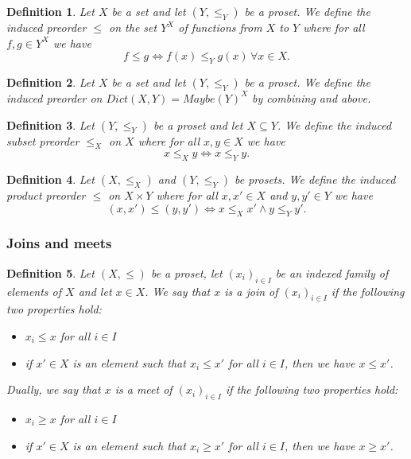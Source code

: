 \documentclass[runningheads]{llncs}
\newtheorem{defn}{Definition}
\begin{document}
\begin{defn}\label{defn:function-preorder}
	Let \(X\) be a set and let \((Y,\leq_Y)\) be a proset. We define the induced preorder \(\leq\) on the set \(Y^X\) of functions from \(X\) to \(Y\) where for all \(f,g \in Y^X\) we have \[f \leq g \Leftrightarrow f(x) \leq_Y g(x)\, \forall x \in X.\]
\end{defn}

\begin{defn}\label{defn:dictionary-preorder}
	Let \(X\) be a set and let \((Y,\leq_Y)\) be a proset. We define the induced preorder on \(Dict(X,Y) = Maybe(Y)^X\) by combining  and  above.
\end{defn}

\begin{defn}\label{defn:subset-preorder}
	Let \((Y,\leq_Y)\) be a proset and let \(X \subseteq Y\). We define the \emph{induced subset preorder} \(\leq_X\) on \(X\) where for all \(x,y \in X\) we have \[x \leq_X y \Leftrightarrow x \leq_Y y.\]
\end{defn}

\begin{defn}\label{defn:product-preorder}
	Let \((X,\leq_X)\) and \((Y,\leq_Y)\) be prosets. We define the \emph{induced product preorder} \(\leq\) on \(X \times Y\) where for all \(x,x' \in X\) and \(y,y' \in Y\) we have \[(x,x') \leq (y,y') \Leftrightarrow x \leq_X x' \wedge y \leq_Y y'.\]
\end{defn}

\subsubsection{Joins and meets}

\begin{defn}
	Let \((X,\leq)\) be a proset, let \((x_i)_{i \in I}\) be an indexed family of elements of \(X\) and let \(x \in X\). We say that \(x\) is a \emph{join} of \((x_i)_{i \in I}\) if the following two properties hold:
	\begin{itemize}
		\item \(x_i \leq x\) for all \(i \in I\)
		\item if \(x' \in X\) is an element such that \(x_i \leq x'\) for all \(i \in I\), then we have \(x \leq x'\).
	\end{itemize}

	Dually, we say that \(x\) is a \emph{meet} of \((x_i)_{i \in I}\) if the following two properties hold:
	\begin{itemize}
		\item \(x_i \geq x\) for all \(i \in I\)
		\item if \(x' \in X\) is an element such that \(x_i \geq x'\) for all \(i \in I\), then we have \(x \geq x'\).
	\end{itemize}
\end{defn}
\end{document}
